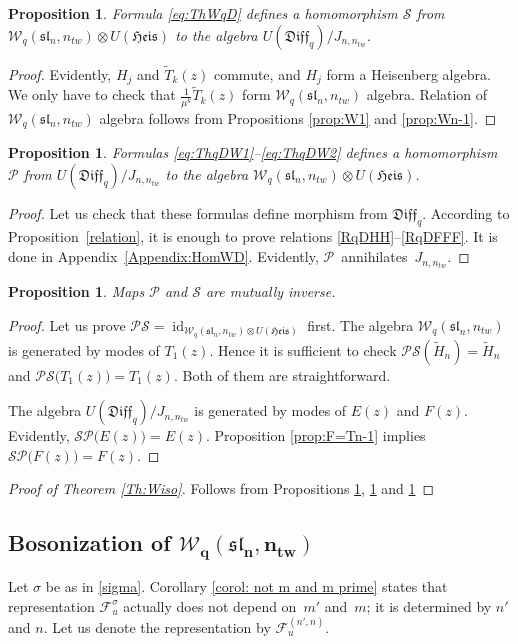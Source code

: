 \documentclass[pdftex]{sigma}
\numberwithin{equation}{section}
\newtheorem{Proposition}[Theorem]{Proposition}
\theoremstyle{definition}
\newcommand{\qD}{\mathfrak{Diff}_q}
\newcommand{\T}{\tilde{T}}
\newcommand{ \twW }{ \mathcal{W}_{q} ( \mathfrak{sl}_n, n_{tw} ) }
\newcommand{\WqD}{\mathcal{S}}
\newcommand{\qDW}{\mathcal{P}}
\newcommand{\UH}{\otimes U(\mathfrak{Heis})}
\newcommand{\WH}{\twW \UH}
\newcommand{\ha}{\tilde{H}}
\DeclareMathOperator{\id}{id}
\begin{document}
\begin{Proposition} \label{prop:Hom(W,qD)}
Formula \eqref{eq:ThWqD} defines a homomorphism $\WqD$ from $\WH$ to the algebra $ U(\qD)/J_{n,n_{tw}}$.
\end{Proposition}

\begin{proof}
Evidently, $H_j$ and $\T_k(z)$ commute, and $H_j$ form a Heisenberg algebra. We only have to check that $\frac{1}{\mu^k} \T_k(z)$ form $\twW$ algebra. Relation of $\twW$ algebra follows from Propositions \ref{prop:W1} and \ref{prop:Wn-1}.
\end{proof}

\begin{Proposition} \label{prop:HomDWtw}
Formulas \eqref{eq:ThqDW1}--\eqref{eq:ThqDW2} defines a homomorphism $\qDW$ from
$U(\qD)/J_{n,n_{tw}}$ to the algebra $\WH$.
\end{Proposition}

\begin{proof}
Let us check that these formulas define morphism from $\qD$. According to Proposition~\ref{relation}, it is enough to prove relations \eqref{RqDHH}--\eqref{RqDFFF}. It is done in Appendix~\ref{Appendix:HomWD}.
Evidently, $\qDW$~annihilates~$J_{n, n_{tw}}$.
\end{proof}

\begin{Proposition} \label{prop:mutinv}
Maps $\qDW$ and $\WqD$ are mutually inverse.
\end{Proposition}

\begin{proof}
Let us prove $\qDW \WqD = \id_{\WH}$ first. The algebra $\twW$ is generated by modes of $T_1(z)$. Hence it is sufficient to check $\qDW \WqD (\ha_n) = \ha_n$ and $\qDW \WqD \big( T_1(z) \big) = T_1(z)$. Both of them are straightforward.

The algebra $U(\qD)/J_{n,n_{tw}}$ is generated by modes of $E(z)$ and $F(z)$. Evidently, $\WqD \qDW \big( E(z) \big)\allowbreak = E(z)$. Proposition \ref{prop:F=Tn-1} implies $\WqD \qDW \big( F(z) \big) = F(z)$.
\end{proof}

\begin{proof}[Proof of Theorem \ref{Th:Wiso}] Follows from Propositions \ref{prop:Hom(W,qD)}, \ref{prop:HomDWtw} and \ref{prop:mutinv}
\end{proof}

\subsection[Bosonization of $\twW$]{Bosonization of $\boldsymbol{\twW}$}
Let $\sigma$ be as in \eqref{sigma}. Corollary \ref{corol: not m and m prime} states that representation $\mathcal{F}_u^{\sigma}$ actually does not depend on~$m'$ and~$m$; it is determined by $n'$ and $n$. Let us denote the representation by $\mathcal{F}_u^{(n',n)}$.
\end{document}

